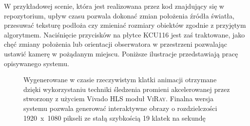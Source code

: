 W przykładowej scenie, która jest realizowana przez kod znajdujący się w repozytorium, upływ czasu pozwala dokonać zmian położenia źródła światła, przesuwać teksturę podłoża czy zmieniać rozmiary obiektów zgodnie z przyjętym algorytmem. Naciśnięcie przycisków na płytce KCU116 jest zaś traktowane, jako chęć zmiany położenia lub orientacji obserwatora w przestrzeni pozwalając ustawić kamerę w pożądanym miejscu. Poniższe ilustracje przedstawiają pracę opisywanego systemu.

\begin{figure}[H]
\centering
{}
\caption[Wygenerowane w czasie rzeczywistym klatki animacji otrzymane dzięki wykorzystaniu techniki śledzenia promieni akcelerowanej przez stworzony z użyciem Vivado HLS moduł \textsc{ViRay}]{Wygenerowane w czasie rzeczywistym klatki animacji otrzymane dzięki wykorzystaniu techniki śledzenia promieni akcelerowanej przez stworzony z użyciem Vivado HLS moduł \textsc{ViRay}. Finalna wersja systemu pozwala generować interaktywne obrazy o rozdzielczości 1920~x~1080 pikseli ze stałą szybkością 19 klatek na sekundę}
\label{ch3:img:system}
\end{figure}

